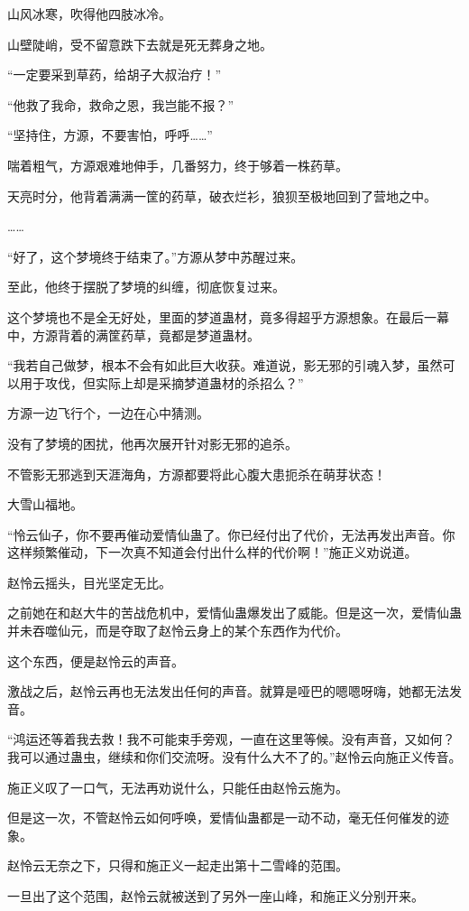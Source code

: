 \begin{this_body}
山风冰寒，吹得他四肢冰冷。

山壁陡峭，受不留意跌下去就是死无葬身之地。

“一定要采到草药，给胡子大叔治疗！”

“他救了我命，救命之恩，我岂能不报？”

“坚持住，方源，不要害怕，呼呼……”

喘着粗气，方源艰难地伸手，几番努力，终于够着一株药草。

天亮时分，他背着满满一筐的药草，破衣烂衫，狼狈至极地回到了营地之中。

……

“好了，这个梦境终于结束了。”方源从梦中苏醒过来。

至此，他终于摆脱了梦境的纠缠，彻底恢复过来。

这个梦境也不是全无好处，里面的梦道蛊材，竟多得超乎方源想象。在最后一幕中，方源背着的满筐药草，竟都是梦道蛊材。

“我若自己做梦，根本不会有如此巨大收获。难道说，影无邪的引魂入梦，虽然可以用于攻伐，但实际上却是采摘梦道蛊材的杀招么？”

方源一边飞行个，一边在心中猜测。

没有了梦境的困扰，他再次展开针对影无邪的追杀。

不管影无邪逃到天涯海角，方源都要将此心腹大患扼杀在萌芽状态！

大雪山福地。

“怜云仙子，你不要再催动爱情仙蛊了。你已经付出了代价，无法再发出声音。你这样频繁催动，下一次真不知道会付出什么样的代价啊！”施正义劝说道。

赵怜云摇头，目光坚定无比。

之前她在和赵大牛的苦战危机中，爱情仙蛊爆发出了威能。但是这一次，爱情仙蛊并未吞噬仙元，而是夺取了赵怜云身上的某个东西作为代价。

这个东西，便是赵怜云的声音。

激战之后，赵怜云再也无法发出任何的声音。就算是哑巴的嗯嗯呀嗨，她都无法发音。

“鸿运还等着我去救！我不可能束手旁观，一直在这里等候。没有声音，又如何？我可以通过蛊虫，继续和你们交流呀。没有什么大不了的。”赵怜云向施正义传音。

施正义叹了一口气，无法再劝说什么，只能任由赵怜云施为。

但是这一次，不管赵怜云如何呼唤，爱情仙蛊都是一动不动，毫无任何催发的迹象。

赵怜云无奈之下，只得和施正义一起走出第十二雪峰的范围。

一旦出了这个范围，赵怜云就被送到了另外一座山峰，和施正义分别开来。


\end{this_body}
